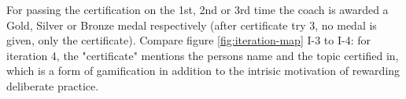    For passing the certification on the 1st, 2nd or 3rd time the coach is awarded a Gold, Silver or Bronze medal respectively (after certificate try 3, no medal is given, only the certificate). Compare figure \ref{fig:iteration-map} I-3 to I-4: for iteration 4, the "certificate" mentions the persons name and the topic certified in, which is a form of gamification in addition to the intrisic motivation of rewarding deliberate practice.
